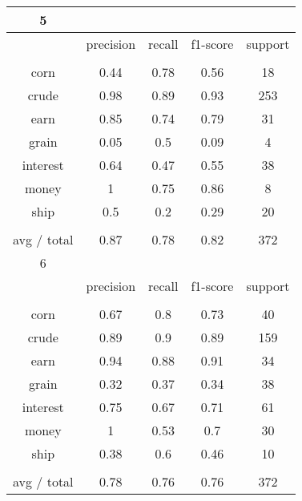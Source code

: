 \documentclass[11pt]{article}
\begin{document}
\begin{center}
\begin{longtable}{| c | c | c | c | c |}
5           &           &        &          &         \\
\hline
           & precision & recall & f1-score & support \\
           &           &        &          &         \\
corn        & 0.44      & 0.78   & 0.56     & 18      \\
crude       & 0.98      & 0.89   & 0.93     & 253     \\
earn        & 0.85      & 0.74   & 0.79     & 31      \\
grain       & 0.05      & 0.5    & 0.09     & 4       \\
interest    & 0.64      & 0.47   & 0.55     & 38      \\
money       & 1         & 0.75   & 0.86     & 8       \\
ship        & 0.5       & 0.2    & 0.29     & 20      \\
           &           &        &          &         \\
avg / total & 0.87      & 0.78   & 0.82     & 372     \\
\hline

6           &           &        &          &         \\
\hline
           & precision & recall & f1-score & support \\
           &           &        &          &         \\
corn        & 0.67      & 0.8    & 0.73     & 40      \\
crude       & 0.89      & 0.9    & 0.89     & 159     \\
earn        & 0.94      & 0.88   & 0.91     & 34      \\
grain       & 0.32      & 0.37   & 0.34     & 38      \\
interest    & 0.75      & 0.67   & 0.71     & 61      \\
money       & 1         & 0.53   & 0.7      & 30      \\
ship        & 0.38      & 0.6    & 0.46     & 10      \\
           &           &        &          &         \\
avg / total & 0.78      & 0.76   & 0.76     & 372     \\
\hline


\end{longtable}
\end{center}
\end{document}
